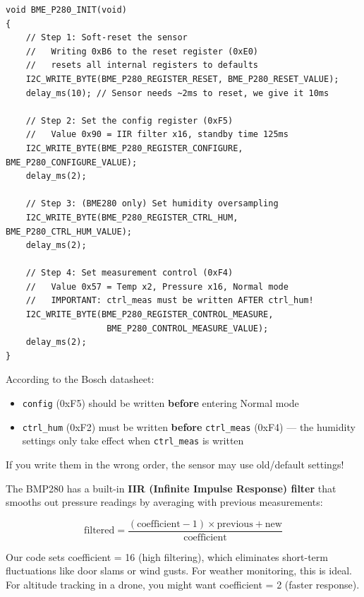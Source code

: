 \documentclass[12pt, a4paper]{article}
\begin{document}
\begin{codebox}
\begin{lstlisting}[style=CStyle]
void BME_P280_INIT(void)
{
    // Step 1: Soft-reset the sensor
    //   Writing 0xB6 to the reset register (0xE0)
    //   resets all internal registers to defaults
    I2C_WRITE_BYTE(BME_P280_REGISTER_RESET, BME_P280_RESET_VALUE);
    delay_ms(10); // Sensor needs ~2ms to reset, we give it 10ms

    // Step 2: Set the config register (0xF5)
    //   Value 0x90 = IIR filter x16, standby time 125ms
    I2C_WRITE_BYTE(BME_P280_REGISTER_CONFIGURE, BME_P280_CONFIGURE_VALUE);
    delay_ms(2);

    // Step 3: (BME280 only) Set humidity oversampling
    I2C_WRITE_BYTE(BME_P280_REGISTER_CTRL_HUM, BME_P280_CTRL_HUM_VALUE);
    delay_ms(2);

    // Step 4: Set measurement control (0xF4)
    //   Value 0x57 = Temp x2, Pressure x16, Normal mode
    //   IMPORTANT: ctrl_meas must be written AFTER ctrl_hum!
    I2C_WRITE_BYTE(BME_P280_REGISTER_CONTROL_MEASURE,
                    BME_P280_CONTROL_MEASURE_VALUE);
    delay_ms(2);
}
\end{lstlisting}
\end{codebox}

\begin{warnbox}
According to the Bosch datasheet:
\begin{itemize}[leftmargin=1.5em]
    \item \texttt{config} (0xF5) should be written \textbf{before} entering Normal mode
    \item \texttt{ctrl\_hum} (0xF2) must be written \textbf{before} \texttt{ctrl\_meas} (0xF4) --- the humidity settings only take effect when \texttt{ctrl\_meas} is written
\end{itemize}
If you write them in the wrong order, the sensor may use old/default settings!
\end{warnbox}

\begin{conceptbox}
The BMP280 has a built-in \textbf{IIR (Infinite Impulse Response) filter} that smooths out pressure readings by averaging with previous measurements:

\[
\text{filtered} = \frac{(\text{coefficient} - 1) \times \text{previous} + \text{new}}{\text{coefficient}}
\]

Our code sets coefficient = 16 (high filtering), which eliminates short-term fluctuations like door slams or wind gusts. For weather monitoring, this is ideal. For altitude tracking in a drone, you might want coefficient = 2 (faster response).
\end{conceptbox}
\end{document}
